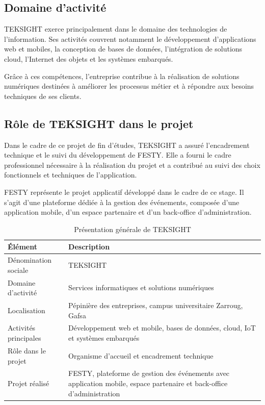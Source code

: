 \subsection{Domaine d’activité}


TEKSIGHT exerce principalement dans le domaine des technologies de l’information. Ses activités couvrent notamment le développement d’applications web et mobiles, la conception de bases de données, l’intégration de solutions cloud, l’Internet des objets et les systèmes embarqués.


Grâce à ces compétences, l’entreprise contribue à la réalisation de solutions numériques destinées à améliorer les processus métier et à répondre aux besoins techniques de ses clients.


\subsection{Rôle de TEKSIGHT dans le projet}


Dans le cadre de ce projet de fin d’études, TEKSIGHT a assuré l’encadrement technique et le suivi du développement de FESTY. Elle a fourni le cadre professionnel nécessaire à la réalisation du projet et a contribué au suivi des choix fonctionnels et techniques de l’application.


FESTY représente le projet applicatif développé dans le cadre de ce stage. Il s’agit d’une plateforme dédiée à la gestion des événements, composée d’une application mobile, d’un espace partenaire et d’un back-office d’administration.


\begin{table}[H]
\centering
\caption{Présentation générale de TEKSIGHT}
\label{tableau:1-1}
\renewcommand{\arraystretch}{1.2}
\begin{tabularx}{\textwidth}{|>{\raggedright\arraybackslash}X|>{\raggedright\arraybackslash}X|}
\hline
\rowcolor[HTML]{ECF4FF}
\textbf{Élément} & \textbf{Description} \\
\hline
Dénomination sociale & TEKSIGHT \\
\hline
Domaine d’activité & Services informatiques et solutions numériques \\
\hline
Localisation & Pépinière des entreprises, campus universitaire Zarroug, Gafsa \\
\hline
Activités principales & Développement web et mobile, bases de données, cloud, IoT et systèmes embarqués \\
\hline
Rôle dans le projet & Organisme d’accueil et encadrement technique \\
\hline
Projet réalisé & FESTY, plateforme de gestion des événements avec application mobile, espace partenaire et back-office d’administration \\
\hline
\end{tabularx}
\end{table}


